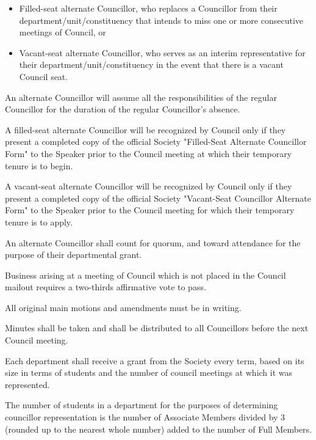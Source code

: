 \begin{longenum}[ label*=\thesubsection.\arabic*., align=left]
\begin{longenum}[ label*=\arabic*., align=left]
\begin{itemize}
		\item Filled-seat alternate Councillor, who replaces a Councillor from their department/unit/constituency that intends to miss one or more consecutive meetings of Council, or
		\item Vacant-seat alternate Councillor, who serves as an interim representative for their department/unit/constituency in the event that there is a vacant Council seat.
		\end{itemize}	 
		An alternate Councillor will assume all the responsibilities of the regular Councillor for the duration of the regular Councillor's absence.
        \item A filled-seat alternate Councillor will be recognized by Council only if they present a completed copy of the official Society "Filled-Seat Alternate Councillor Form" to the Speaker prior to the Council meeting at which their temporary tenure is to begin.
        \item A vacant-seat alternate Councillor will be recognized by Council only if they present a completed copy of the official Society "Vacant-Seat Councillor Alternate Form" to the Speaker prior to the Council meeting for which their temporary tenure is to apply. 
        \item An alternate Councillor shall count for quorum, and toward attendance for the purpose of their departmental grant. 
	\end{longenum}
    \item Business arising at a meeting of Council which is not placed in the Council mailout requires a two-thirds affirmative vote to pass.

    \item All original main motions and amendments must be in writing.
    \item Minutes shall be taken and shall be distributed to all Councillors before the next Council meeting.
    \item Each department shall receive a grant from the Society every term, based on its size in terms of students and the number of council meetings at which it was represented.
    \item The number of students in a department for the purposes of determining councillor representation is the number of Associate Members divided by 3 (rounded up to the nearest whole number) added to the number of Full Members. 


\end{longenum}
